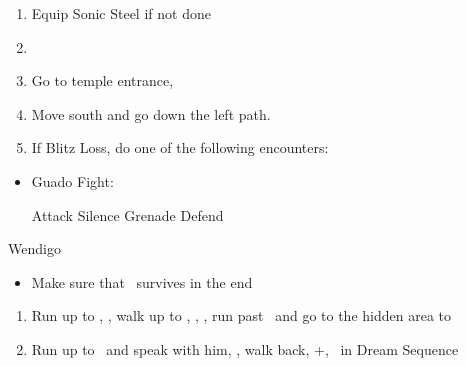 \begin{enumerate}[resume]
  \item Equip Sonic Steel if not done
  \item \formation{\tidus}{\rikku}{\yuna}
  \item Go to temple entrance, \sd
  \item Move south and go down the left path.
  \item If Blitz Loss, do one of the following encounters:
\end{enumerate}
\begin{encounters}
  \begin{itemize}
    \item Guado Fight:
          \begin{itemize}
            \tidusf Attack
            \rikkuf Silence Grenade
            \yunaf Defend
          \end{itemize}
  \end{itemize}
\end{encounters}
\begin{battle}[18000]{Wendigo}
  \begin{itemize}
    \tidusf Haste \tidus
    \tidusf Switch Weapon to Brotherhood
    \tidusf Attack Guado B
    \rikkuf Light Curtain \tidus
    \tidusf Attack Wendigo
    \yunaf Defend/Heal \tidus/Phoenix Down Dead Ally
    \rikkuf Defend/Heal \tidus/Steal Guado/Phoenix Down Dead Ally
    \switch{\yuna}{\auron}
    \item Make sure that \yuna\ survives in the end
  \end{itemize}
\end{battle}
\begin{enumerate}[resume]
  \item Run up to \rikku, \sd, walk up to \yuna, \sd, \save, run past \kimahri\ and go to the hidden area to 
  \item Run up to \auron\ and speak with him, \sd, walk back, \cs+\skippablefmv[1:00], \sd\ in Dream Sequence
\end{enumerate}